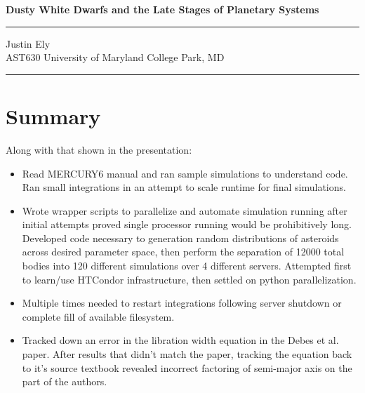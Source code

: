 \documentclass[a4paper,11pt]{article}
\begin{document}
\begin{flushright}

\vspace{1.1cm}

{\bf\large Dusty White Dwarfs and the Late Stages of Planetary Systems}

\rule{0.25\linewidth}{0.5pt}

\vspace{0.1cm}
Justin Ely \\
\vspace{0.1cm}
\footnotesize{AST630 University of Maryland College Park, MD\\}
\vspace{0.1cm}
\end{flushright}

\noindent\rule{\linewidth}{1.0pt}
\section*{Summary}

Along with that shown in the presentation:

\begin{itemize}
\item Read MERCURY6 manual and ran sample simulations to understand code.  Ran small integrations in an attempt to scale runtime for final simulations.
\item Wrote wrapper scripts to parallelize and automate simulation running after initial attempts proved single processor running would be prohibitively long.  Developed code necessary to generation random distributions of asteroids across desired parameter space, then perform the separation of 12000 total bodies into 120 different simulations over 4 different servers.  Attempted first to learn/use HTCondor infrastructure, then settled on python parallelization.
\item Multiple times needed to restart integrations following server shutdown or complete fill of available filesystem.
\item Tracked down an error in the libration width equation in the Debes et al. paper.  After results that didn't match the paper, tracking the equation back to it's source textbook revealed incorrect factoring of semi-major axis on the part of the authors.

\end{itemize}
\end{document}
